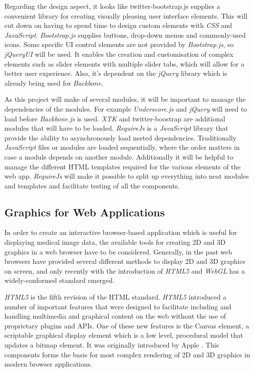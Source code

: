 \documentclass[a4paper,11pt,twoside]{article}
\begin{document}
Regarding the design aspect, it looks like twitter-bootstrap.js supplies a convenient library for creating visually pleasing user interface elements. This will cut down on having to spend time to design custom elements with \textit{CSS} and \textit{JavaScript}. \textit{Bootstrap.js} supplies buttons, drop-down menus and commonly-used icons. Some specific UI control elements are not provided by \textit{Bootstrap.js}, so \textit{jQueryUI} will be used. It enables the creation and customisation of complex elements such as slider elements with multiple slider tabs, which will allow for a better user experience. Also, it's dependent on the \textit{jQuery} library which is already being used for \textit{Backbone}.

As this project will make of several modules, it will be important to manage the dependencies of the modules. For example \textit{Underscore.js} and \textit{jQuery} will need to load before \textit{Backbone.js} is used. \textit{XTK} and twitter-boostrap are additional modules that will have to be loaded. \textit{RequireJs} is a \textit{JavaScript} library that provide the ability to asynchronously load nested dependencies. Traditionally \textit{JavaScript} files or modules are loaded sequentially, where the order matters in case a module depends on another module. Additionally it will be helpful to manage the different HTML templates required for the various elements of the web app. \textit{RequireJs} will make it possible to split up everything into neat modules and templates and facilitate testing of all the components.



\subsection{Graphics for Web Applications}

In order to create an interactive browser-based application which is useful for displaying medical image data, the available tools for creating 2D and 3D graphics in a web browser have to be considered. Generally, in the past web browsers have provided several different methods to display 2D and 3D graphics on screen, and only recently with the introduction of \textit{HTML5} and \textit{WebGL} has a widely-conformed standard emerged.

\textit{HTML5} is the fifth revision of the HTML standard. \textit{HTML5} introduced a number of important features that were designed to facilitate including and handling multimedia and graphical content on the web without the use of proprietary plugins and APIs. One of these new features is the Canvas element, a scriptable graphical display element which is a low level, procedural model that updates a bitmap element. It was originally introduced by Apple \cite{canvas} . This components forms the basis for most complex rendering of 2D and 3D graphics in modern browser applications.
\end{document}
